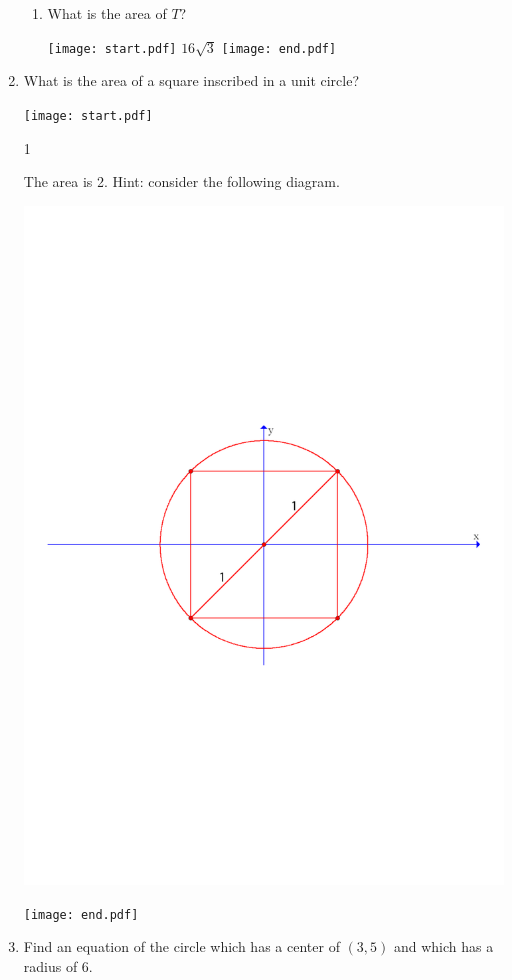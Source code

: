 \documentclass[12pt]{article}
\begin{document}
\begin{enumerate}
\begin{enumerate}
\item What is the area of $T$?

\texttt{[image: start.pdf]}
{$16\sqrt{3}$}
\texttt{[image: end.pdf]}


\end{enumerate}

\item What is the area of a square inscribed in a unit circle?

\texttt{[image: start.pdf]}
{{1\linewidth}{The area is 2. Hint: consider the following diagram.
\begin{center}
\includegraphics[scale=0.5]{inscribed.pdf}
\end{center}}}
\texttt{[image: end.pdf]}


\item Find an equation of the circle which has a center of $(3,5)$ and which has a radius of 6.


\end{enumerate}
\end{document}
